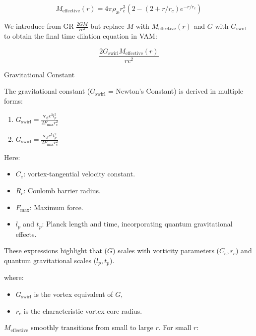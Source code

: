 \documentclass[a4paper,10pt]{article}
\begin{document}
\begin{equation*}
    M_\text{effective}(r) = 4\pi \rho_\text{\ae} r_c^3 \left( 2 - (2 + r/r_c) e^{-r / r_c} \right)
\end{equation*}


We introduce from GR $\frac{2 G M}{r c^2}$ but replace $M$ with $M_\text{effective}(r)$ and $G$ with $ G_\text{swirl}$ to obtain the final time dilation equation in VAM:

\begin{equation*}
\frac{2  G_\text{swirl} M_\text{effective}(r)}{r c^2}
\end{equation*}

Gravitational Constant

The gravitational constant ($ G_\text{swirl}$ = Newton's Constant) is derived in multiple forms:

\begin{enumerate}
\item $ G_\text{swirl} = \frac{\mathbf{v}_{\scriptscriptstyle\boldsymbol{\circlearrowleft}} c^3 l_p^2}{2 F_{\max} r_c^2}$
\item $ G_\text{swirl} = \frac{\mathbf{v}_{\scriptscriptstyle\boldsymbol{\circlearrowleft}} c^5 t_p^2}{2 F_{\max} r_c^2}$
\end{enumerate}

Here:

\begin{itemize}
\item $C_e$: vortex-tangential velocity constant.
\item $R_c$: Coulomb barrier radius.
\item $ F_{\max} $: Maximum force.
\item $l_p$ and $t_p$: Planck length and time, incorporating quantum gravitational effects.
\end{itemize}

These expressions highlight that ($G$) scales with vorticity parameters ($C_e, r_c$) and quantum gravitational scales ($l_p, t_p$).




where:

\begin{itemize}
    \item $ G_\text{swirl}$ is the vortex equivalent of $G$,
    \item $r_c$ is the characteristic vortex core radius.
\end{itemize}

$M_\text{effective}$ smoothly transitions from small to large $r$. For small $r$:
\end{document}
